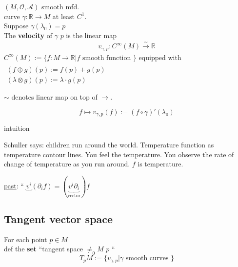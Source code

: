 	\begin{definition}
		$(M,\mathcal{O},\mathcal{A})$ smooth mfd. \\
		curve $\gamma : \mathbb{R} \to M$ at least $C^1$.   \\
		Suppose $\gamma(\lambda_0) =p$ \\
		The \textbf{velocity} of $\gamma$ \@ $p$ is the linear map 
		\[
		\begin{gathered}
		v_{\gamma, p} : C^{\infty}(M) \xrightarrow{ \sim } \mathbb{R}
		\end{gathered}
		\]
		$C^{\infty}(M) := \lbrace f: M \to \mathbb{R} | f \text{ smooth function } \rbrace$ equipped with $\begin{gathered}  \quad \\ 
		(f\oplus g)(p) := f(p) + g(p) \\
		(\lambda \otimes g)(p) := \lambda \cdot g(p) \end{gathered}$
		
		$\sim$ denotes linear map on top of $\xrightarrow{}$.
		
		\[
		f \mapsto v_{\gamma,p}(f):= (f\circ \gamma)'(\lambda_0)
		\]
		
		
	\end{definition}
	
	intuition
	
	
	
	Schuller says: children run around the world.  Temperature function as temperature contour lines.  You feel the temperature.  You observe the rate of change of temperature as you run around.  $f$ is temperature.  
	
	\underline{past}: `` $\underbrace{v^i}_{} (\partial_i f) = (\underbrace{v^i \partial_i}_{\text{vector}})f$ 
	
	\subsection{Tangent vector space}
	
	\begin{definition}
		For each point $p \in M$ \\
		def the \textbf{set} ``tangent space $\neq_0 M$ \@ $p$ ``
		\[
		T_p M := \lbrace v_{\gamma, p} | \gamma \text{ smooth curves } \rbrace
		\]
	\end{definition}
	
